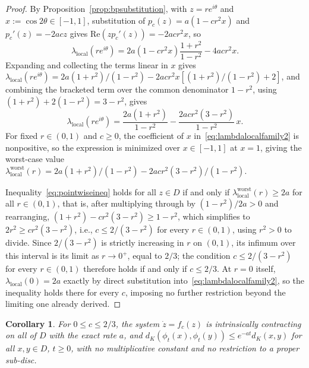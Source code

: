 \documentclass[pdflatex,sn-mathphys-num]{sn-jnl}%
\theoremstyle{thmstyleone}%
\theoremstyle{thmstyletwo}%
\theoremstyle{thmstylethree}%
\newtheorem{corollary}{Corollary}
\begin{document}
\begin{proof}
By Proposition~\ref{prop:bpsubstitution}, with $z=re^{i\theta}$ and $x:=\cos2\theta\in[-1,1]$, substitution of $p_c(z)=a(1-cr^2x)$ and $p_c'(z)=-2acz$ gives $\mathrm{Re}(zp_c'(z))=-2acr^2x$, so
\begin{equation}
\lambda_{\mathrm{local}}(re^{i\theta}) = 2a(1-cr^2x)\frac{1+r^2}{1-r^2} - 4acr^2x. \label{eq:lambdalocalfamily}
\end{equation}
Expanding and collecting the terms linear in $x$ gives $\lambda_{\mathrm{local}}(re^{i\theta})=2a(1+r^2)/(1-r^2)-2acr^2x[(1+r^2)/(1-r^2)+2]$, and combining the bracketed term over the common denominator $1-r^2$, using $(1+r^2)+2(1-r^2)=3-r^2$, gives
\begin{equation}
\lambda_{\mathrm{local}}(re^{i\theta}) = \frac{2a(1+r^2)}{1-r^2} - \frac{2acr^2(3-r^2)}{1-r^2}\,x. \label{eq:lambdalocalfamily2}
\end{equation}
For fixed $r\in(0,1)$ and $c\ge0$, the coefficient of $x$ in~\eqref{eq:lambdalocalfamily2} is nonpositive, so the expression is minimized over $x\in[-1,1]$ at $x=1$, giving the worst-case value $\lambda_{\mathrm{local}}^{\mathrm{worst}}(r)=2a(1+r^2)/(1-r^2)-2acr^2(3-r^2)/(1-r^2)$.

Inequality~\eqref{eq:pointwiseineq} holds for all $z\in D$ if and only if $\lambda_{\mathrm{local}}^{\mathrm{worst}}(r)\ge2a$ for all $r\in(0,1)$, that is, after multiplying through by $(1-r^2)/2a>0$ and rearranging, $(1+r^2)-cr^2(3-r^2)\ge1-r^2$, which simplifies to $2r^2\ge cr^2(3-r^2)$, i.e., $c\le2/(3-r^2)$ for every $r\in(0,1)$, using $r^2>0$ to divide. Since $2/(3-r^2)$ is strictly increasing in $r$ on $(0,1)$, its infimum over this interval is its limit as $r\to0^+$, equal to $2/3$; the condition $c\le2/(3-r^2)$ for every $r\in(0,1)$ therefore holds if and only if $c\le2/3$. At $r=0$ itself, $\lambda_{\mathrm{local}}(0)=2a$ exactly by direct substitution into~\eqref{eq:lambdalocalfamily2}, so the inequality holds there for every $c$, imposing no further restriction beyond the limiting one already derived.
\end{proof}

\begin{corollary}
\label{cor:globalrate}
For $0\le c\le2/3$, the system $\dot z=f_c(z)$ is intrinsically contracting on all of $D$ with the exact rate $a$, and $d_K(\phi_t(x),\phi_t(y))\le e^{-at}d_K(x,y)$ for all $x,y\in D$, $t\ge0$, with no multiplicative constant and no restriction to a proper sub-disc.
\end{corollary}
\end{document}
